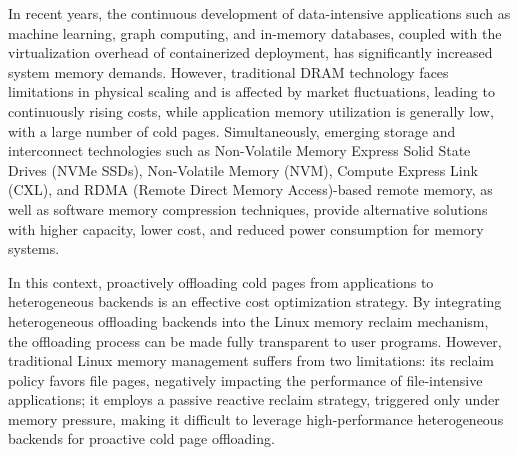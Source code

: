 \begin{englishabstract}

In recent years, the continuous development of data-intensive applications such as machine learning, graph computing, and in-memory databases, coupled with the virtualization overhead of containerized deployment, has significantly increased system memory demands. However, traditional DRAM technology faces limitations in physical scaling and is affected by market fluctuations, leading to continuously rising costs, while application memory utilization is generally low, with a large number of cold pages. Simultaneously, emerging storage and interconnect technologies such as Non-Volatile Memory Express Solid State Drives (NVMe SSDs), Non-Volatile Memory (NVM), Compute Express Link (CXL), and RDMA (Remote Direct Memory Access)-based remote memory, as well as software memory compression techniques, provide alternative solutions with higher capacity, lower cost, and reduced power consumption for memory systems.

In this context, proactively offloading cold pages from applications to heterogeneous backends is an effective cost optimization strategy. By integrating heterogeneous offloading backends into the Linux memory reclaim mechanism, the offloading process can be made fully transparent to user programs. However, traditional Linux memory management suffers from two limitations: its reclaim policy favors file pages, negatively impacting the performance of file-intensive applications; it employs a passive reactive reclaim strategy, triggered only under memory pressure, making it difficult to leverage high-performance heterogeneous backends for proactive cold page offloading.


\end{englishabstract}
